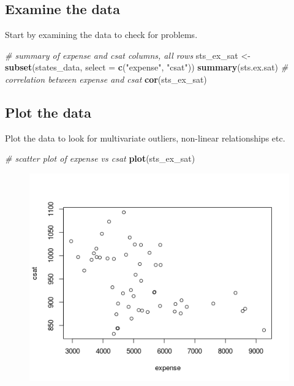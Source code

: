 \documentclass[]{book}
\newenvironment{Shaded}{\begin{snugshade}}{\end{snugshade}}
\newcommand{\KeywordTok}[1]{\textcolor[rgb]{0.13,0.29,0.53}{\textbf{#1}}}
\newcommand{\DataTypeTok}[1]{\textcolor[rgb]{0.13,0.29,0.53}{#1}}
\newcommand{\StringTok}[1]{\textcolor[rgb]{0.31,0.60,0.02}{#1}}
\newcommand{\CommentTok}[1]{\textcolor[rgb]{0.56,0.35,0.01}{\textit{#1}}}
\newcommand{\NormalTok}[1]{#1}
\begin{document}
\subsection{Examine the data}\label{examine-the-data}

Start by examining the data to check for problems.

\begin{Shaded}
\begin{Highlighting}[]
  \CommentTok{# summary of expense and csat columns, all rows}
\NormalTok{  sts_ex_sat <-}\StringTok{ }\KeywordTok{subset}\NormalTok{(states_data, }\DataTypeTok{select =} \KeywordTok{c}\NormalTok{(}\StringTok{"expense"}\NormalTok{, }\StringTok{"csat"}\NormalTok{))}
  \KeywordTok{summary}\NormalTok{(sts.ex.sat)}
  \CommentTok{# correlation between expense and csat}
  \KeywordTok{cor}\NormalTok{(sts_ex_sat) }
\end{Highlighting}
\end{Shaded}

\subsection{Plot the data}\label{plot-the-data}

Plot the data to look for multivariate outliers, non-linear
relationships etc.

\begin{Shaded}
\begin{Highlighting}[]
  \CommentTok{# scatter plot of expense vs csat}
  \KeywordTok{plot}\NormalTok{(sts_ex_sat)}
\end{Highlighting}
\end{Shaded}

\begin{figure}
\centering
\includegraphics{R/Rmodels/images/statesCorr1.png}
\caption{}
\end{figure}
\end{document}
